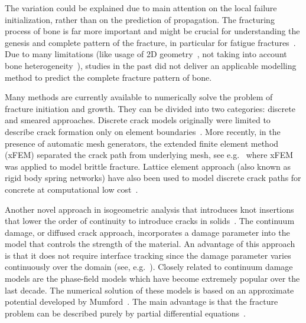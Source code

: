 \documentclass[11pt]{acmeArticle}
\numberwithin{equation}{section}
\begin{document}
The variation could be explained due to main attention on the local failure initialization, rather than on the prediction of propagation. 
The fracturing process of bone is far more important and might be crucial for understanding the genesis and complete pattern of the fracture, in particular for fatigue fractures~\citep{gupta2008fracture}. 
Due to many limitations (like usage of 2D geometry~\citep{bettamer2017using}, not taking into account bone heterogeneity~\citep{gasser2007numerical}), 
studies in the past did not deliver an applicable modelling method to predict the complete fracture pattern of bone.

Many methods are currently available to numerically solve the problem of fracture initiation and growth. 
They can be divided into two categories: discrete and smeared approaches. 
Discrete crack models originally were limited to describe crack formation only on element boundaries~\citep{Scordelis1967}. 
More recently, in the presence of automatic mesh generators, the extended finite element method (xFEM) separated the crack path from underlying mesh, see e.g.~\citep{Belytschko1999} where xFEM was applied to model brittle fracture. 
Lattice element approach (also known as rigid body spring networks) have also been used to model discrete crack paths for concrete at computational low cost~\citep{bolanderSaito1998, grassl2010}.
 
Another novel approach in isogeometric analysis that introduces knot insertions that lower the order of continuity to introduce cracks in solids~\citep{Hosseini2014}. 
The continuum damage, or diffused crack approach, incorporates a damage parameter into the model that controls the strength of the material. An advantage of this approach is that it does not require interface tracking since the damage parameter varies continuously over the domain (see, e.g.~\citep{deBorst2004}). 
Closely related to continuum damage models are the phase-field models which have become extremely popular over the last decade. 
The numerical solution of these models is based on an approximate potential developed by Mumford~\citep{Mumford1989}. 
The main advantage is that the fracture problem can be described purely by partial differential equations~\citep{Miehe2010a,Borst2014}. \\
\end{document}
